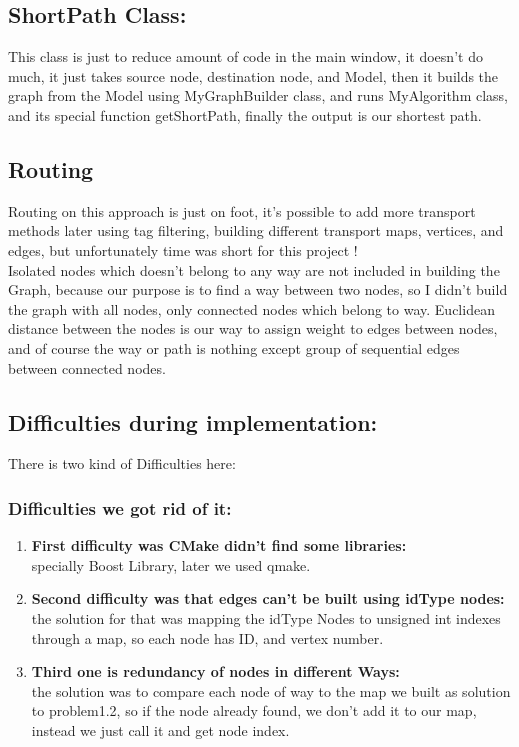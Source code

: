 \documentclass[a4paper, 12pt, english]{book}
\begin{document}
\subsection{ ShortPath Class:}
This class is just to reduce amount of code in the main window, it doesn’t do much, it just takes source node, destination node, and Model, then it builds the graph from the Model using MyGraphBuilder class, and runs MyAlgorithm class, and its special function getShortPath, finally the output is our shortest path.

\subsection{Routing}
Routing on this approach is just on foot, it's possible to add more transport methods later using tag filtering, building different transport maps, vertices, and edges, but unfortunately time was short for this project !\\

Isolated nodes which doesn't belong to any way are not included in building the Graph, because our purpose is to find a way between two nodes, so I didn't build the graph with all nodes, only connected nodes which belong to way.
Euclidean distance between the nodes is our way to assign weight to edges between nodes, and of course the way or path is nothing except group of sequential edges between connected nodes.
\subsection{Difficulties during implementation:}
There is two kind of Difficulties here:
\subsubsection{Difficulties we got rid of it:} 
\begin{enumerate}
	\item {\textbf{First difficulty was CMake didn’t find some libraries:}}\\
	specially Boost Library, later we used qmake.
	\item {\textbf{Second difficulty was that edges can’t be built using idType nodes:}\\
		the solution for that was mapping the idType Nodes to unsigned int indexes through a map, so each node has ID, and vertex number.}
	\item{\textbf{Third one is redundancy of nodes in different Ways:}\\
		the solution was to compare each node of way to the map we built as solution to
		problem1.2, so if the node already found, we don’t add it to our map, instead we just call it and get node index.}	
\end{enumerate}
\end{document}
